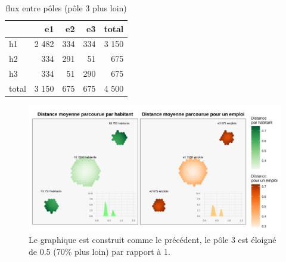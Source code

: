 \documentclass[
  10pt,
  a4paper,
  numbers=noendperiod,
  DIV=9]{scrartcl}
\begin{document}
\hypertarget{tbl-fluxpoles2}{}
\begin{longtable}{lrrrr}
\caption{\label{tbl-fluxpoles2}flux entre pôles (pôle 3 plus loin) }\tabularnewline

\toprule
 & e1 & e2 & e3 & total \\ 
\midrule
h1 & 2 482 & 334 & 334 & 3 150 \\ 
h2 & 334 & 291 & 51 & 675 \\ 
h3 & 334 & 51 & 290 & 675 \\ 
total & 3 150 & 675 & 675 & 4 500 \\ 
\bottomrule
\end{longtable}

\begin{figure}[htb]

{\centering \includegraphics[width=1\textwidth,height=\textheight]{output/gdistances2.png}

}

\caption[Distances moyenne par habitant et pour un emploi (3
éloigné)]{\label{fig-distances2}Le graphique est construit comme le
précédent, le pôle 3 est éloigné de 0.5 (70\% plus loin) par rapport à
1.}

\end{figure}
\end{document}

